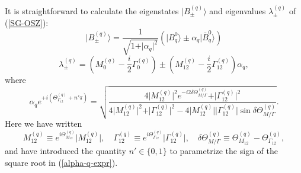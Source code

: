 \documentclass[11pt]{cernrep}
\begin{document}
It is straightforward to calculate the eigenstates 
$\vert B_{\pm}^{(q)}\rangle$ and eigenvalues $\lambda_{\pm}^{(q)}$ 
of (\ref{SG-OSZ}):
\begin{equation}
\vert B_{\pm}^{(q)} \rangle  =
\frac{1}{\sqrt{1+\vert \alpha_q\vert^{2}}}
\left(\vert B^{0}_q\rangle\pm\alpha_q\vert\bar B^{0}_q\rangle\right)
\end{equation}
\begin{equation}\label{lam-pm}
\lambda_{\pm}^{(q)}  =
\left(M_{0}^{(q)}-\frac{i}{2}\Gamma_{0}^{(q)}\right)\pm
\left(M_{12}^{(q)}-\frac{i}{2}\Gamma_{12}^{(q)}\right)\alpha_q,
\end{equation}
where
\begin{equation}\label{alpha-q-expr}
\alpha_q e^{+i\left(\Theta_{\Gamma_{12}}^{(q)}+n'
\pi\right)}=
\sqrt{\frac{4\vert M_{12}^{(q)}\vert^{2}
e^{-i2\delta\Theta_{M/\Gamma}^{(q)}}+\vert\Gamma_{12}^{(q)}\vert^{2}}{4\vert 
M_{12}^{(q)}\vert^{2}+\vert\Gamma_{12}^{(q)}\vert^{2}- 
4\vert M_{12}^{(q)}\vert\vert\Gamma_{12}^{(q)}\vert
\sin\delta\Theta_{M/\Gamma}^{(q)}}}.
\end{equation}
Here we have written
\begin{equation}
M_{12}^{(q)}\equiv e^{i\Theta_{M_{12}}^{(q)}}\vert
M_{12}^{(q)}\vert,\quad \Gamma_{12}^{(q)}\equiv
e^{i\Theta_{\Gamma_{12}}^{(q)}}\vert\Gamma_{12}^{(q)}\vert,\quad
\delta\Theta_{M/\Gamma}^{(q)}\equiv
\Theta_{M_{12}}^{(q)}-\Theta_{\Gamma_{12}}^{(q)},
\end{equation}
and have introduced the quantity $n'\in\{0,1\}$ to parametrize the 
sign of the square root in (\ref{alpha-q-expr}). 
\end{document}
